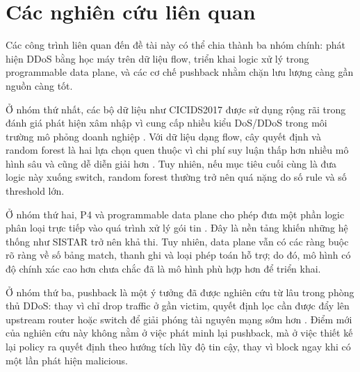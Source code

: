 \section{Các nghiên cứu liên quan}

Các công trình liên quan đến đề tài này có thể chia thành ba nhóm chính: phát hiện DDoS bằng học máy trên dữ liệu flow, triển khai logic xử lý trong programmable data plane, và các cơ chế pushback nhằm chặn lưu lượng càng gần nguồn càng tốt.

Ở nhóm thứ nhất, các bộ dữ liệu như CICIDS2017 được sử dụng rộng rãi trong đánh giá phát hiện xâm nhập vì cung cấp nhiều kiểu DoS/DDoS trong môi trường mô phỏng doanh nghiệp \cite{sharafaldin2018cicids}. Với dữ liệu dạng flow, cây quyết định và random forest là hai lựa chọn quen thuộc vì chi phí suy luận thấp hơn nhiều mô hình sâu và cũng dễ diễn giải hơn \cite{breiman2001random}. Tuy nhiên, nếu mục tiêu cuối cùng là đưa logic này xuống switch, random forest thường trở nên quá nặng do số rule và số threshold lớn.

Ở nhóm thứ hai, P4 và programmable data plane cho phép đưa một phần logic phân loại trực tiếp vào quá trình xử lý gói tin \cite{bosshart2014p4}. Đây là nền tảng khiến những hệ thống như SISTAR trở nên khả thi. Tuy nhiên, data plane vẫn có các ràng buộc rõ ràng về số bảng match, thanh ghi và loại phép toán hỗ trợ; do đó, mô hình có độ chính xác cao hơn chưa chắc đã là mô hình phù hợp hơn để triển khai.

Ở nhóm thứ ba, pushback là một ý tưởng đã được nghiên cứu từ lâu trong phòng thủ DDoS: thay vì chỉ drop traffic ở gần victim, quyết định lọc cần được đẩy lên upstream router hoặc switch để giải phóng tài nguyên mạng sớm hơn \cite{mahajan2002controlling}. Điểm mới của nghiên cứu này không nằm ở việc phát minh lại pushback, mà ở việc thiết kế lại policy ra quyết định theo hướng tích lũy độ tin cậy, thay vì block ngay khi có một lần phát hiện malicious.

